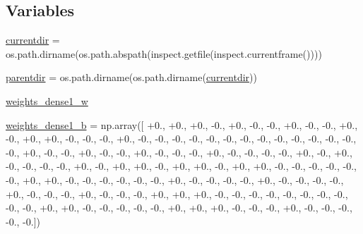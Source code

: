\subsection*{Variables}
\begin{DoxyCompactItemize}
\item 
\hyperlink{namespacepybullet-gym_1_1pybulletgym_1_1examples_1_1roboschool-weights_1_1enjoy___t_f___hopper_py_bullet_env__v0__2017may_aae0404ddece566abd701c3b8bc0f6d02}{currentdir} = os.\+path.\+dirname(os.\+path.\+abspath(inspect.\+getfile(inspect.\+currentframe())))
\item 
\hyperlink{namespacepybullet-gym_1_1pybulletgym_1_1examples_1_1roboschool-weights_1_1enjoy___t_f___hopper_py_bullet_env__v0__2017may_acff18f3dbe8c8e21c5309302458467b7}{parentdir} = os.\+path.\+dirname(os.\+path.\+dirname(\hyperlink{namespacepybullet-gym_1_1pybulletgym_1_1examples_1_1roboschool-weights_1_1enjoy___t_f___hopper_py_bullet_env__v0__2017may_aae0404ddece566abd701c3b8bc0f6d02}{currentdir}))
\item 
\hyperlink{namespacepybullet-gym_1_1pybulletgym_1_1examples_1_1roboschool-weights_1_1enjoy___t_f___hopper_py_bullet_env__v0__2017may_ae8b90ae7b2735e0ad5b4c6d9f72c54c5}{weights\+\_\+dense1\+\_\+w}
\item 
\hyperlink{namespacepybullet-gym_1_1pybulletgym_1_1examples_1_1roboschool-weights_1_1enjoy___t_f___hopper_py_bullet_env__v0__2017may_a9deab49c4926bad65c3fcad54d477420}{weights\+\_\+dense1\+\_\+b} = np.\+array(\mbox{[} +0., +0., +0., -\/0., +0., -\/0., -\/0., +0., -\/0., -\/0., +0., -\/0., +0., +0., -\/0., -\/0., -\/0., +0., -\/0., -\/0., -\/0., -\/0., -\/0., -\/0., -\/0., -\/0., -\/0., -\/0., -\/0., -\/0., -\/0., -\/0., +0., -\/0., -\/0., +0., -\/0., -\/0., +0., -\/0., -\/0., -\/0., +0., -\/0., -\/0., -\/0., -\/0., +0., -\/0., +0., -\/0., -\/0., -\/0., -\/0., +0., -\/0., +0., +0., -\/0., +0., +0., -\/0., +0., +0., -\/0., -\/0., -\/0., -\/0., -\/0., -\/0., +0., +0., -\/0., -\/0., -\/0., -\/0., -\/0., -\/0., +0., -\/0., -\/0., -\/0., -\/0., +0., -\/0., -\/0., -\/0., -\/0., +0., -\/0., -\/0., -\/0., +0., -\/0., -\/0., -\/0., +0., +0., +0., -\/0., -\/0., -\/0., -\/0., -\/0., -\/0., -\/0., -\/0., -\/0., -\/0., +0., +0., -\/0., -\/0., -\/0., -\/0., -\/0., +0., +0., +0., -\/0., -\/0., -\/0., +0., -\/0., -\/0., -\/0., -\/0., -\/0.\mbox{]})

\end{DoxyCompactItemize}
